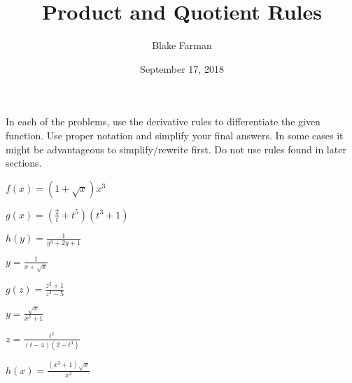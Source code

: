 \documentclass[10pt]{amsart}
\title[Product and Quotient]{Product and Quotient Rules}
\date{September 17, 2018}
\author{Blake Farman}
\begin{document}
\maketitle

\makenameslot

In each of the problems, use the derivative rules to differentiate the given function.
Use proper notation and simplify your final answers.
In some cases it might be advantageous to simplify/rewrite first.
Do not use rules found in later sections.

\begin{multicols}{2}
  \begin{thm}
    \(\displaystyle{f(x) = \left(1 + \sqrt{x}\right) x^3}\)
  \end{thm}

  \vspace{1.25in}

  \begin{thm}
    \(\displaystyle{g(x) = \left(\frac{2}{t} + t^5\right)(t^3 + 1)}\)
  \end{thm}

  \vspace{1.25in}

  \begin{thm}
    \(\displaystyle{h(y) = \frac{1}{y^3 + 2y + 1}}\)
  \end{thm}

  \vspace{1.25in}
  
  \begin{thm}
    \(\displaystyle{y = \frac{1}{x + \sqrt{x}}}\)
  \end{thm}

  \vspace{1.25in}
  
  \begin{thm}
    \(\displaystyle{g(z) = \frac{z^2 + 1}{z^3 - 5}}\)
  \end{thm}

  \vspace{1.25in}
  
  \begin{thm}
    \(\displaystyle{y = \frac{\sqrt{x}}{x^3 + 1}}\)
  \end{thm}

  \vspace{1.25in}
\end{multicols}

\newpage
\begin{multicols}{2}
  \begin{thm}
    \(\displaystyle{z = \frac{t^2}{(t - 4)(2 - t^3)}}\)
  \end{thm}

  \begin{thm}
    \(\displaystyle{h(x) = \frac{\left(x^3 + 1\right)\sqrt{x}}{x^2}}\)
  \end{thm}
\end{multicols}
\end{document}
